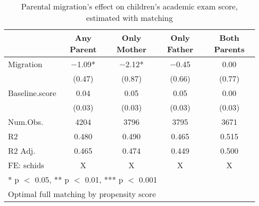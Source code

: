 \documentclass[
  man]{apa7}
\begin{document}
\begin{table}

\caption{Parental migration’s effect on children’s academic exam score, estimated with matching}
\centering
\begin{tabular}[t]{lcccc}
\toprule
  & Any Parent & Only Mother & Only Father & Both Parents\\
\midrule
Migration & \num{-1.09}* & \num{-2.12}* & \num{-0.45} & \num{0.00}\\
 & (\num{0.47}) & (\num{0.87}) & (\num{0.66}) & (\num{0.77})\\
Baseline.score & \num{0.04} & \num{0.05} & \num{0.05} & \num{0.00}\\
 & (\num{0.03}) & (\num{0.03}) & (\num{0.03}) & (\num{0.03})\\
\midrule
Num.Obs. & \num{4204} & \num{3796} & \num{3795} & \num{3671}\\
R2 & \num{0.480} & \num{0.490} & \num{0.465} & \num{0.515}\\
R2 Adj. & \num{0.465} & \num{0.474} & \num{0.449} & \num{0.500}\\
FE: schids & X & X & X & X\\
\bottomrule
\multicolumn{5}{l}{\rule{0pt}{1em}* p $<$ 0.05, ** p $<$ 0.01, *** p $<$ 0.001}\\
\multicolumn{5}{l}{\rule{0pt}{1em}Optimal full matching by propensity score}\\
\end{tabular}
\end{table}
\end{document}
